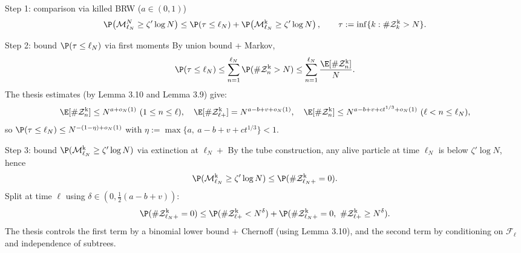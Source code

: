 \begin{block}{Step 1: comparison via killed BRW ($a\in(0,1)$)}
\[
    \P\!\left(\mathcal M^N_{\ell_N}\ge \zeta'\log N\right)
    \le
    \P(\tau\le \ell_N)
    +
    \P\!\left(\mathcal M^{\mathrm k}_{\ell_N}\ge \zeta'\log N\right),
    \qquad
    \tau:=\inf\{k:\#\mathcal Z^{\mathrm k}_k>N\}.
\]
\end{block}

\begin{block}{Step 2: bound $\P(\tau\le \ell_N)$ via first moments}
By union bound + Markov,
\[
    \P(\tau\le \ell_N)
    \le
    \sum_{n=1}^{\ell_N}\P(\#\mathcal Z^{\mathrm k}_n>N)
    \le
    \sum_{n=1}^{\ell_N}\frac{\E[\#\mathcal Z^{\mathrm k}_n]}{N}.
\]
The thesis estimates (by Lemma 3.10 and Lemma 3.9) give:
\[
    \E[\#\mathcal Z^{\mathrm k}_n]\le N^{a+o_N(1)}\ (1\le n\le \ell),\quad
    \E[\#\mathcal Z^{\mathrm k}_{\ell+}]=N^{a-b+v+o_N(1)},\quad
    \E[\#\mathcal Z^{\mathrm k}_n]\le N^{a-b+v+ct^{1/3}+o_N(1)}\ (\ell<n\le \ell_N),
\]
so $\P(\tau\le \ell_N)\le N^{-(1-\eta)+o_N(1)}$ with $\eta:=\max\{a,\ a-b+v+ct^{1/3}\}<1$.
\end{block}

\begin{block}{Step 3: bound $\P(\mathcal M^{\mathrm k}_{\ell_N}\ge \zeta'\log N)$ via extinction at $\ell_N+$}
By the tube construction, any alive particle at time $\ell_N$ is below $\zeta'\log N$, hence
\[
    \P(\mathcal M^{\mathrm k}_{\ell_N}\ge \zeta'\log N)
    \le
    \P(\#\mathcal Z^{\mathrm k}_{\ell_N+}=0).
\]
Split at time $\ell$ using $\delta\in(0,\tfrac12(a-b+v))$:
\[
    \P(\#\mathcal Z^{\mathrm k}_{\ell_N+}=0)
    \le
    \P(\#\mathcal Z^{\mathrm k}_{\ell+}<N^\delta)
    +
    \P(\#\mathcal Z^{\mathrm k}_{\ell_N+}=0,\ \#\mathcal Z^{\mathrm k}_{\ell+}\ge N^\delta).
\]
The thesis controls the first term by a binomial lower bound + Chernoff (using Lemma 3.10), and the second term by conditioning on $\mathscr F_\ell$ and independence of subtrees.
\end{block}

